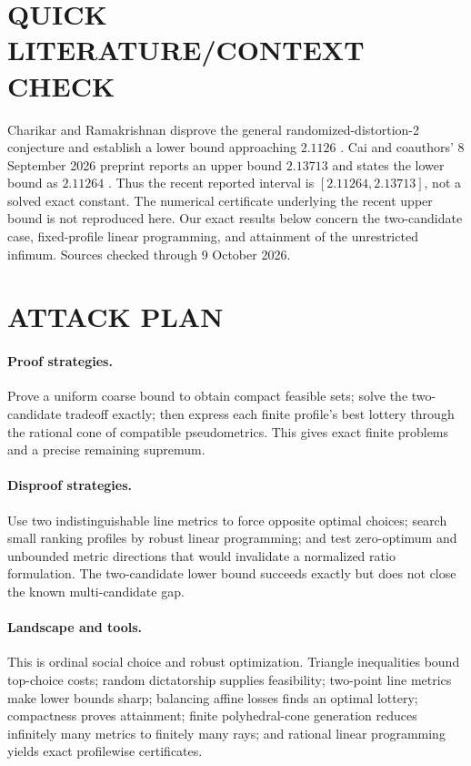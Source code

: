 \documentclass[11pt,a4paper]{article}
\theoremstyle{definition}
\theoremstyle{remark}
\begin{document}
\section{QUICK LITERATURE/CONTEXT CHECK}
Charikar and Ramakrishnan disprove the general randomized-distortion-2 conjecture and establish a lower bound approaching $2.1126$ \cite{d71-cr}. Cai and coauthors' 8 September 2026 preprint reports an upper bound $2.13713$ and states the lower bound as $2.11264$ \cite{d71-cai}. Thus the recent reported interval is $[2.11264,2.13713]$, not a solved exact constant. The numerical certificate underlying the recent upper bound is not reproduced here. Our exact results below concern the two-candidate case, fixed-profile linear programming, and attainment of the unrestricted infimum. Sources checked through 9 October 2026.

\section{ATTACK PLAN}
\paragraph{Proof strategies.}
Prove a uniform coarse bound to obtain compact feasible sets; solve the two-candidate tradeoff exactly; then express each finite profile's best lottery through the rational cone of compatible pseudometrics. This gives exact finite problems and a precise remaining supremum.

\paragraph{Disproof strategies.}
Use two indistinguishable line metrics to force opposite optimal choices; search small ranking profiles by robust linear programming; and test zero-optimum and unbounded metric directions that would invalidate a normalized ratio formulation. The two-candidate lower bound succeeds exactly but does not close the known multi-candidate gap.

\paragraph{Landscape and tools.}
This is ordinal social choice and robust optimization. Triangle inequalities bound top-choice costs; random dictatorship supplies feasibility; two-point line metrics make lower bounds sharp; balancing affine losses finds an optimal lottery; compactness proves attainment; finite polyhedral-cone generation reduces infinitely many metrics to finitely many rays; and rational linear programming yields exact profilewise certificates.
\end{document}
